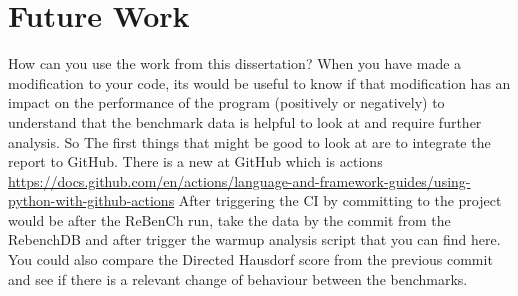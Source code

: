 \documentclass{article}
\begin{document}
\section{Future Work}

How can you use the work from this dissertation?
When you have made a modification to your code, its would be useful to know if that modification has an impact on the performance of the program (positively or negatively) to understand that the benchmark data is helpful to look at and require further analysis. So The first things that might be good to look at are to integrate the report to GitHub. There is a new  at GitHub which is  actions \url{https://docs.github.com/en/actions/language-and-framework-guides/using-python-with-github-actions}
After triggering the CI by committing to the project would be after the ReBenCh run, take the data by the commit from the RebenchDB and after trigger the warmup analysis script that you can find here.
You could also compare the Directed Hausdorf score from the previous commit and see if there is a relevant change of behaviour between the benchmarks. 


\end{document}
